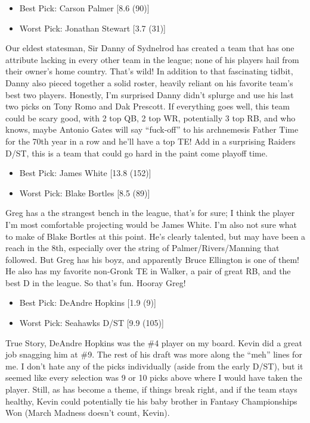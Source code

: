 \documentclass[11pt,letterpaper]{article}
\begin{document}
\begin{itemize}
\item Best Pick: Carson Palmer [8.6 (90)]
\item Worst Pick: Jonathan Stewart [3.7 (31)]
\end{itemize}
Our eldest statesman, Sir Danny of Sydnelrod has created a team that has one attribute lacking in every other team in the league; none of his players hail from their owner's home country. That's wild! In addition to that fascinating tidbit, Danny also pieced together a solid roster, heavily reliant on his favorite team's best two players. Honestly, I'm surprised Danny didn't splurge and use his last two picks on Tony Romo and Dak Prescott. If everything goes well, this team could be scary good, with 2 top QB, 2 top WR, potentially 3 top RB, and who knows, maybe Antonio Gates will say ``fuck-off'' to his archnemesis Father Time for the 70th year in a row and he'll have a top TE! Add in a surprising Raiders D/ST, this is a team that could go hard in the paint come playoff time.

\newpage
{}
\begin{itemize}
\item Best Pick: James White [13.8 (152)]
\item Worst Pick: Blake Bortles [8.5 (89)]
\end{itemize}
Greg has a the strangest bench in the league, that's for sure; I think the player I'm most comfortable projecting would be James White. I'm also not sure what to make of Blake Bortles at this point. He's clearly talented, but may have been a reach in the 8th, especially over the string of Palmer/Rivers/Manning that followed. But Greg has his boyz, and apparently Bruce Ellington is one of them! He also has my favorite non-Gronk TE in Walker, a pair of great RB, and the best D in the league. So that's fun. Hooray Greg!

\begin{itemize}
\item Best Pick: DeAndre Hopkins [1.9 (9)]
\item Worst Pick: Seahawks D/ST [9.9 (105)]
\end{itemize}
True Story, DeAndre Hopkins was the \#4 player on my board. Kevin did a great job snagging him at \#9. The rest of his draft was more along the ``meh'' lines for me. I don't hate any of the picks individually (aside from the early D/ST), but it seemed like every selection was 9 or 10 picks above where I would have taken the player. Still, as has become a theme, if things break right, and if the team stays healthy, Kevin could potentially tie his baby brother in Fantasy Championships Won (March Madness doesn't count, Kevin).
\end{document}
